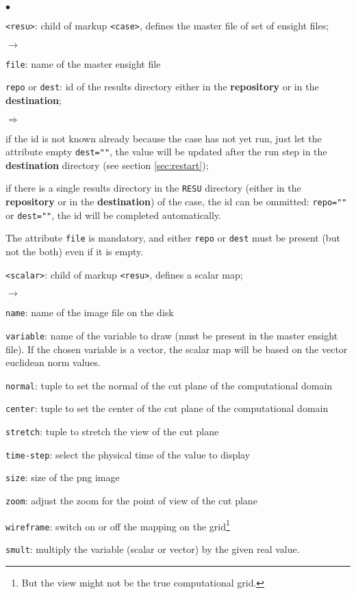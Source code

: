 \documentclass[a4paper,10pt,twoside]{csshortdoc}
\begin{document}
\begin{list}{$\bullet$}{}
\item \texttt{<resu>}: child of markup \texttt{<case>}, defines the master file
of set of ensight files;
\begin{list}{$\rightarrow$}{}
\item \texttt{file}: name of the master ensight file
\item \texttt{repo} or \texttt{dest}: id of the results directory either in the
\textbf{repository} or in the \textbf{destination};
\begin{list}{$\Rightarrow$}{}
\item if the id is not known already because the case has not yet run, just let
the attribute empty \texttt{dest=""}, the value will be updated after the run
step in the \textbf{destination} directory (see section \ref{sec:restart});
\item if there is a single results directory in the \texttt{RESU} directory
(either in the \textbf{repository} or in the \textbf{destination}) of the case,
the id can be ommitted: \texttt{repo=""} or \texttt{dest=""}, the id will be
completed automatically.
\end{list}
\end{list}
The attribute \texttt{file} is mandatory, and either \texttt{repo} or
\texttt{dest} must be present (but not the both) even if it is empty.

\item \texttt{<scalar>}: child of markup \texttt{<resu>}, defines a scalar map;
\begin{list}{$\rightarrow$}{}
\item \texttt{name}: name of the image file on the disk
\item \texttt{variable}: name of the variable to draw (must be present in the master ensight file).
If the chosen variable is a vector, the scalar map will be based on the vector euclidean norm values.
\item \texttt{normal}: tuple to set the normal of the cut plane of the computational domain
\item \texttt{center}: tuple to set the center of the cut plane of the computational domain
\item \texttt{stretch}: tuple to stretch the view of the cut plane
\item \texttt{time-step}: select the physical time of the value to display
\item \texttt{size}: size of the png image
\item \texttt{zoom}: adjust the zoom for the point of view of the cut plane
\item \texttt{wireframe}: switch on or off the mapping on the grid\footnote{But the view might not be the true computational grid.}
\item \texttt{smult}: multiply the variable (scalar or vector) by the given real value.
\end{list}


\end{list}
\end{document}
